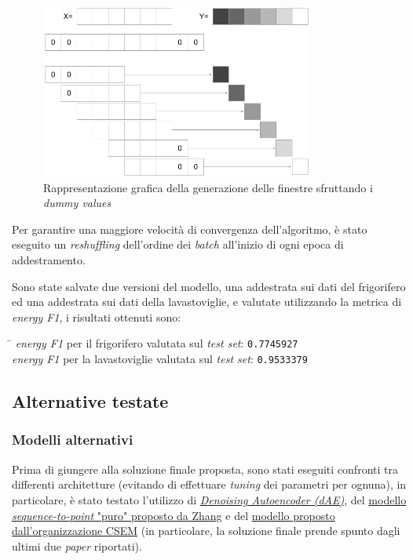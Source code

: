 \documentclass[12pt,a4paper,fleqn]{article}
\begin{document}
\begin{figure}
\centering
\includegraphics[width=0.8\textwidth]{images/padding.png}
\caption{Rappresentazione grafica della generazione delle finestre sfruttando i \textsl{dummy values}}
\label{fig:padding}
\end{figure}

Per garantire una maggiore velocità di convergenza dell'algoritmo, è stato eseguito un \textsl{reshuffling} dell'ordine dei \textsl{batch} all'inizio di ogni epoca di addestramento.

Sono state salvate due versioni del modello, una addestrata sui dati del frigorifero ed una addestrata sui dati della lavastoviglie, e valutate utilizzando la metrica di \textsl{energy F1}, i risultati ottenuti sono:

\begin{tabbing}
\hspace{3.75in}     \= \hspace{1.00in}		\kill
\textsl{energy F1} per il frigorifero valutata sul \textsl{test set}: \> \texttt{0.7745927}\\
\textsl{energy F1} per la lavastoviglie valutata sul \textsl{test set}: \> \texttt{0.9533379}
\end{tabbing}

\subsection{Alternative testate}

\subsubsection{Modelli alternativi}
Prima di giungere alla soluzione finale proposta, sono stati eseguiti confronti tra differenti architetture (evitando di effettuare \textsl{tuning} dei parametri per ognuna), in particolare, è stato testato l'utilizzo di \href{https://arxiv.org/abs/1507.06594}{\textsl{Denoising Autoencoder (dAE)}}, del \href{https://arxiv.org/abs/1612.09106}{modello \textsl{sequence-to-point} "puro" proposto da Zhang} e del \href{http://nilmworkshop.org/2018/proceedings/Poster_ID20.pdf}{modello proposto dall'organizzazione CSEM} (in particolare, la soluzione finale prende spunto dagli ultimi due \textsl{paper} riportati).
\end{document}
